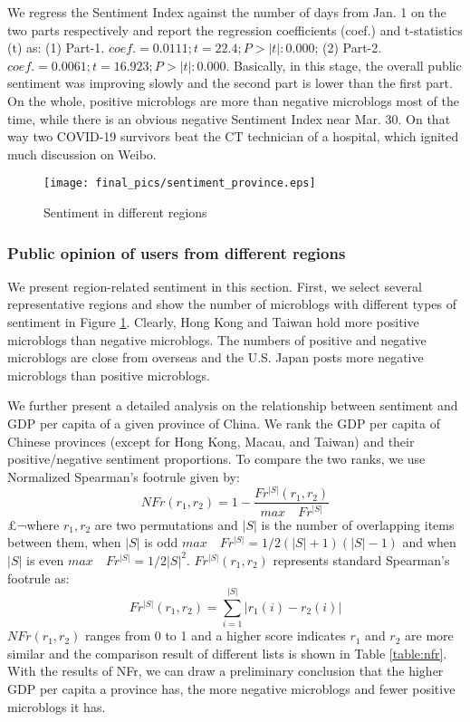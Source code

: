 \documentclass[sigconf, nonacm=true]{acmart}
\begin{document}
We regress the Sentiment Index against the number of days from Jan. 1 on the two parts respectively and report the regression coefficients (coef.) and t-statistics (t) as:
(1) Part-1. $coef.= 0.0111; t=22.4;  P>|t|:0.000$;
(2) Part-2. $coef.= 0.0061; t=16.923;  P>|t|:0.000$.
Basically, in this stage, the overall public sentiment was improving slowly and the second part is lower than the first part.
On the whole, positive microblogs are more than negative microblogs most of the time, while there is an obvious negative Sentiment Index near Mar. 30.
On that way two COVID-19 survivors beat the CT technician of a hospital, which ignited much discussion on Weibo.
\begin{figure}[h]
  \texttt{[image: final\_pics/sentiment\_province.eps]}
  \vspace{-0.3cm}
  \caption{Sentiment in different regions}
  \vspace{-0.2cm}
  \label{figure:sentiment_province}
\end{figure}
\vspace{-0.3cm}
\vspace{-0.2cm}
\subsubsection{Public opinion of users from different regions}
We present region-related sentiment in this section.
First, we select several representative regions and show the number of microblogs with different types of sentiment in Figure \ref{figure:sentiment_province}. Clearly, Hong Kong and Taiwan hold more positive microblogs than negative microblogs.
The numbers of positive and negative microblogs are close from overseas and the U.S.
Japan posts more negative microblogs than positive microblogs.

We further present a detailed analysis on the relationship between sentiment and GDP per capita of a given province of China.
We rank the GDP per capita of Chinese provinces (except for Hong Kong, Macau, and Taiwan) and their positive/negative sentiment proportions.
To compare the two ranks, we use Normalized Spearman's footrule given by:
\begin{equation}
NFr(r_1,r_2) = 1 - \frac{Fr^{|S|}(r_1,r_2)} {max\quad Fr^{|S|}}
\end{equation}
£¬where $r_1,r_2$ are two permutations and $|S|$ is the number of overlapping items between them, when $|S|$ is odd $max\quad Fr^{|S|}=1/2(|S|+1)(|S|-1)$ and when $|S|$ is even $max\quad Fr^{|S|}=1/2|S|^2$.
$Fr^{|S|}(r_1,r_2)$  represents standard Spearman's footrule as:
\begin{equation}
Fr^{|S|}(r_1,r_2) = \sum_{i=1}^{|S|}|r_1(i) - r_2(i)|
\end{equation}
$NFr(r_1,r_2)$ ranges from 0 to 1 and a higher score indicates $r_1$ and $r_2$ are more similar and the comparison result of different lists is shown in Table  \ref{table:nfr}.
With the results of NFr, we can draw a preliminary conclusion that the higher GDP per capita a province has, the more negative microblogs and fewer positive microblogs it has.
\end{document}
